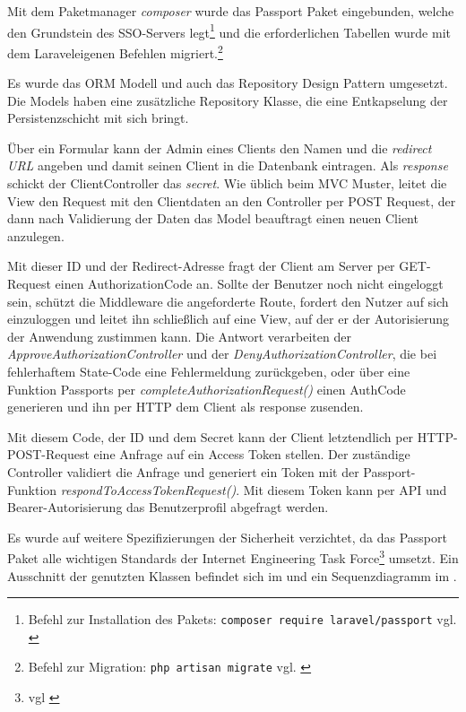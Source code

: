 Mit dem Paketmanager \textit{composer} wurde das Passport Paket eingebunden, welche den Grundstein des \ac{SSO}-Servers legt\footnote{Befehl zur Installation des Pakets: \texttt{composer require laravel/passport} vgl. \cite{composer}} und die erforderlichen Tabellen wurde mit dem Laraveleigenen Befehlen migriert.\footnote{Befehl zur Migration: \texttt{php artisan migrate} vgl. \cite{Laravel}}

Es wurde das ORM Modell und auch das Repository Design Pattern umgesetzt. Die Models haben eine zusätzliche  Repository Klasse, die eine Entkapselung der Persistenzschicht mit sich bringt.

Über ein Formular kann der Admin eines Clients den Namen und die \textit{redirect URL} angeben und damit seinen Client in die Datenbank eintragen. Als \textit{response} schickt der ClientController das \textit{secret}.
Wie üblich beim MVC Muster, leitet die View den Request mit den Clientdaten an den Controller per POST Request, der dann nach Validierung der Daten das Model beauftragt einen neuen Client anzulegen. 

Mit dieser ID und der Redirect-Adresse fragt der Client am Server per GET-Request einen AuthorizationCode an. Sollte der Benutzer noch nicht eingeloggt sein, schützt die Middleware die angeforderte Route, fordert den Nutzer auf sich einzuloggen und leitet ihn schließlich auf eine View, auf der er der Autorisierung der Anwendung zustimmen kann. Die Antwort verarbeiten der \textit{ApproveAuthorizationController} und der \textit{DenyAuthorizationController}, die bei fehlerhaftem State-Code eine Fehlermeldung zurückgeben, oder über eine Funktion Passports per \textit{completeAuthorizationRequest()} einen AuthCode generieren und ihn per HTTP dem Client als response zusenden.

Mit diesem Code, der ID und dem Secret kann der Client letztendlich per HTTP-POST-Request eine Anfrage auf ein Access Token stellen. Der zuständige Controller validiert die Anfrage und generiert ein Token mit der Passport-Funktion \textit{respondToAccessTokenRequest()}. Mit diesem Token kann per API und Bearer-Autorisierung das Benutzerprofil abgefragt werden.

Es wurde auf weitere Spezifizierungen der Sicherheit verzichtet, da das Passport Paket alle wichtigen Standards der Internet Engineering Task Force\footnote{vgl \cite{OAuth2}}  umsetzt. Ein Ausschnitt der genutzten Klassen befindet sich im   und ein Sequenzdiagramm im .

